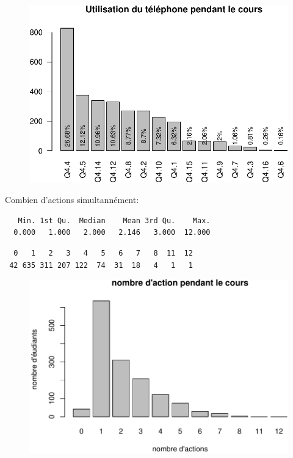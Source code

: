 \documentclass[]{article}
\begin{document}
\begin{figure}[htbp]
\centering
\includegraphics{qs_etudiants_files/figure-latex/Q4-1.pdf}
\end{figure}

Combien d'actions simultannément:

\begin{verbatim}
   Min. 1st Qu.  Median    Mean 3rd Qu.    Max. 
  0.000   1.000   2.000   2.146   3.000  12.000 
\end{verbatim}

\begin{verbatim}
  0   1   2   3   4   5   6   7   8  11  12 
 42 635 311 207 122  74  31  18   4   1   1 
\end{verbatim}

\begin{figure}[htbp]
\centering
\includegraphics{qs_etudiants_files/figure-latex/actions_sim-1.pdf}
\end{figure}
\end{document}
